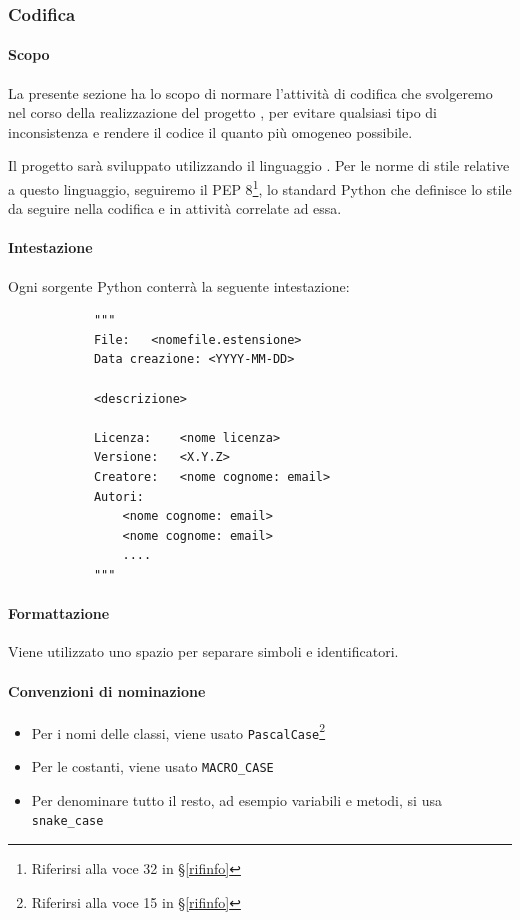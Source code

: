         \newpage

		\subsubsection{Codifica}\label{PP:Sviluppo:Codifica}

		\paragraph{Scopo}
		La presente sezione ha lo scopo di normare l'attività di codifica che svolgeremo nel corso della realizzazione del progetto \progetto, per
		evitare qualsiasi tipo di inconsistenza e rendere il codice il quanto più omogeneo possibile.

		Il progetto sarà sviluppato utilizzando il linguaggio .
		Per le norme di stile relative a questo linguaggio, seguiremo il PEP 8\footnote{Riferirsi alla voce
		32
		  in \S\ref{rifinfo}},
		lo standard Python che definisce lo stile da seguire nella codifica e in attività correlate ad essa.

        \paragraph{Intestazione}\label{PP:Sviluppo:Codifica:Intestazione}
		Ogni sorgente Python conterrà la seguente intestazione:
		\begin{verbatim}
			"""
			File:	<nomefile.estensione>
			Data creazione: <YYYY-MM-DD>

			<descrizione>

			Licenza:	<nome licenza>
			Versione:	<X.Y.Z>
			Creatore:	<nome cognome: email>
			Autori:
				<nome cognome: email>
				<nome cognome: email>
				....
			"""
		\end{verbatim}

		\paragraph{Formattazione}\label{PP:Sviluppo:Codifica:Formattazione}
		Viene utilizzato uno spazio per separare simboli e identificatori.
		


		\paragraph{Convenzioni di nominazione}\label{PP:Sviluppo:Codifica:ConvenzioniDiNominazione}
		\begin{itemize}
			\item Per i nomi delle classi, viene usato \texttt{PascalCase}\footnote{Riferirsi alla voce
			15
			  in \S\ref{rifinfo}}
			\item Per le costanti, viene usato \texttt{MACRO\_CASE}
			\item Per denominare tutto il resto, ad esempio variabili e metodi, si usa \texttt{snake\_case}
		\end{itemize}

